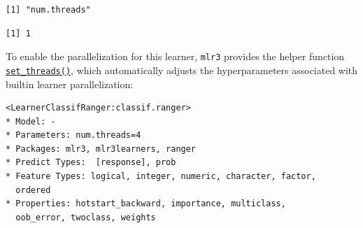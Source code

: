 \begin{Shaded}
\begin{Highlighting}[]
\OtherTok{=} \NormalTok{(}\NormalTok{)}

\SpecialCharTok{$}\SpecialCharTok{$}\NormalTok{(} \NormalTok{)}
\end{Highlighting}
\end{Shaded}

\begin{verbatim}
[1] "num.threads"
\end{verbatim}

\begin{Shaded}
\begin{Highlighting}[]
\SpecialCharTok{$}\SpecialCharTok{$}\SpecialCharTok{$}
\end{Highlighting}
\end{Shaded}

\begin{verbatim}
[1] 1
\end{verbatim}

To enable the parallelization for this learner, \texttt{mlr3} provides
the helper function
\href{https://mlr3.mlr-org.com/reference/set_threads.html}{\texttt{set\_threads()}},
which automatically adjusts the hyperparameters associated with builtin
learner parallelization:

\begin{Shaded}
\begin{Highlighting}[]
 \NormalTok{)}
\end{Highlighting}
\end{Shaded}

\begin{verbatim}
<LearnerClassifRanger:classif.ranger>
* Model: -
* Parameters: num.threads=4
* Packages: mlr3, mlr3learners, ranger
* Predict Types:  [response], prob
* Feature Types: logical, integer, numeric, character, factor,
  ordered
* Properties: hotstart_backward, importance, multiclass,
  oob_error, twoclass, weights
\end{verbatim}

